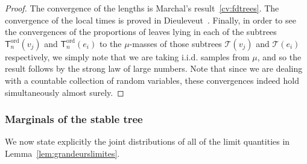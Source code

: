 \documentclass[10pt]{amsart}
\theoremstyle{definition}\newtheorem{defi}[theo]{Definition}\newtheorem{rema}[theo]{Remark}\newtheorem{exam}[theo]{Example}\newtheorem{exem}[theo]{Example}\newtheorem{nota}[theo]{Notation}
\newcommand{\ord}{\mathrm{ord}}
\newcommand{\cT}{\mathcal{T}}
\newcommand{\sT}{\mathsf{T}}
\begin{document}
\begin{proof}
The convergence of the lengths is Marchal's result~\eqref{cv:fdtrees}. The convergence of the local times is proved in Dieuleveut~\cite[Lemma~2.7 \& Lemma~2.8]{Dieuleveut15}. Finally, in order to see the convergences of the proportions of leaves lying in each of the subtrees $\sT_n^{\ord}(v_j)$ and $\sT_n^{\ord}(e_i)$ to the $\mu$-masses of those subtrees $\cT(v_j)$ and $\cT(e_i)$ respectively, we simply note that we are taking i.i.d. samples from $\mu$, and so the result follows by the strong law of large numbers. Note that since we are dealing with a countable collection of random variables, these convergences indeed hold simultaneously almost surely.
\end{proof}


\subsubsection{Marginals of the stable tree}\label{sec:marginalsstable}

We now state explicitly the joint distributions of all of the limit quantities in Lemma~\ref{lem:grandeurslimites}.
\end{document}
